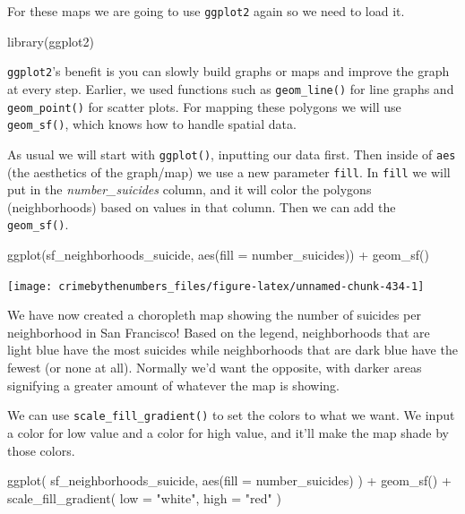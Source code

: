 \documentclass[
  a4paper,
]{krantz}
\makeatletter
\newenvironment{Shaded}{\begin{snugshade}}{\end{snugshade}}
\newcommand{\AttributeTok}[1]{\textcolor[rgb]{0.61,0.61,0.61}{#1}}
\newcommand{\FunctionTok}[1]{\textcolor[rgb]{0,0,0}{#1}}
\newcommand{\NormalTok}[1]{#1}
\newcommand{\SpecialCharTok}[1]{\textcolor[rgb]{0,0,0}{#1}}
\newcommand{\StringTok}[1]{\textcolor[rgb]{0.5,0.5,0.5}{#1}}
\newenvironment{kframe}{%
\medskip{}
\setlength{\fboxsep}{.8em}
 \def\at@end@of@kframe{}%
 \ifinner\ifhmode%
  \def\at@end@of@kframe{\end{minipage}}%
  \begin{minipage}{\columnwidth}%
 \fi\fi%
 \def\FrameCommand##1{\hskip\@totalleftmargin \hskip-\fboxsep
 \colorbox{shadecolor}{##1}\hskip-\fboxsep
     \hskip-\linewidth \hskip-\@totalleftmargin \hskip\columnwidth}%
 \MakeFramed {\advance\hsize-\width
   \@totalleftmargin\z@ \linewidth\hsize
   \@setminipage}}%
 {\par\unskip\endMakeFramed%
 \at@end@of@kframe}
\renewenvironment{Shaded}{\begin{kframe}}{\end{kframe}}
\makeatother
\begin{document}
For these maps we are going to use \texttt{ggplot2} again so
we need to load it.

\begin{Shaded}
\begin{Highlighting}[]
\FunctionTok{library}\NormalTok{(ggplot2)}
\end{Highlighting}
\end{Shaded}

\texttt{ggplot2}'s benefit is you can slowly build graphs or
maps and improve the graph at every step. Earlier, we used
functions such as \texttt{geom\_line()} for line graphs and
\texttt{geom\_point()} for scatter plots. For mapping these
polygons we will use \texttt{geom\_sf()}, which knows how to
handle spatial data.

As usual we will start with \texttt{ggplot()}, inputting our
data first. Then inside of \texttt{aes} (the aesthetics of
the graph/map) we use a new parameter \texttt{fill}. In
\texttt{fill} we will put in the \emph{number\_suicides}
column, and it will color the polygons (neighborhoods) based
on values in that column. Then we can add the
\texttt{geom\_sf()}.

\begin{Shaded}
\begin{Highlighting}[]
\FunctionTok{ggplot}\NormalTok{(sf\_neighborhoods\_suicide, }\FunctionTok{aes}\NormalTok{(}\AttributeTok{fill =}\NormalTok{ number\_suicides)) }\SpecialCharTok{+}
  \FunctionTok{geom\_sf}\NormalTok{()}
\end{Highlighting}
\end{Shaded}

\begin{center}\texttt{[image: crimebythenumbers\_files/figure-latex/unnamed-chunk-434-1]} \end{center}

We have now created a choropleth map showing the number of
suicides per neighborhood in San Francisco! Based on the
legend, neighborhoods that are light blue have the most
suicides while neighborhoods that are dark blue have the
fewest (or none at all). Normally we'd want the opposite,
with darker areas signifying a greater amount of whatever
the map is showing.

We can use \texttt{scale\_fill\_gradient()} to set the
colors to what we want. We input a color for low value and a
color for high value, and it'll make the map shade by those
colors.

\begin{Shaded}
\begin{Highlighting}[]
\FunctionTok{ggplot}\NormalTok{(}
\NormalTok{  sf\_neighborhoods\_suicide,}
  \FunctionTok{aes}\NormalTok{(}\AttributeTok{fill =}\NormalTok{ number\_suicides)}
\NormalTok{) }\SpecialCharTok{+}
  \FunctionTok{geom\_sf}\NormalTok{() }\SpecialCharTok{+}
  \FunctionTok{scale\_fill\_gradient}\NormalTok{(}
    \AttributeTok{low =} \StringTok{"white"}\NormalTok{,}
    \AttributeTok{high =} \StringTok{"red"}
\NormalTok{  )}
\end{Highlighting}
\end{Shaded}
\end{document}
